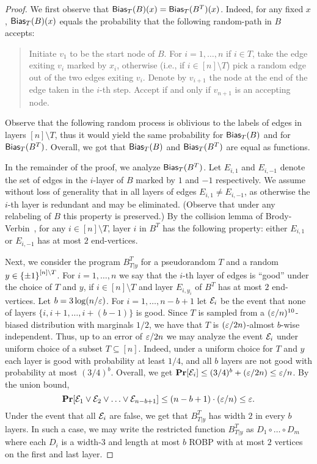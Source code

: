 \begin{proof}
We first observe that $\mathsf{Bias}_T(B)(x) = \mathsf{Bias}_T(B^T)(x)$.
Indeed, for any fixed $x$, $\mathsf{Bias}_T(B)(x)$ equals the probability that the following random-path in $B$ accepts:
\begin{quote}
Initiate $v_1$ to be the start node of $B$. For $i=1, \ldots, n$ if $i \in T$, take the edge exiting $v_i$ marked by $x_i$, otherwise (i.e., if $i\in [n]\setminus T$) pick a random edge out of the two edges exiting $v_{i}$. Denote by $v_{i+1}$ the node at the end of the edge taken in the $i$-th step. Accept if and only if $v_{n+1}$ is an accepting node.\end{quote}
 Observe that the following random process is oblivious to the labels of edges in layers $[n]\setminus T$, thus it would yield the same probability for $\mathsf{Bias}_T(B)$ and for $\mathsf{Bias}_T(B^{T})$. Overall, we got that $\mathsf{Bias}_T(B)$ and $\mathsf{Bias}_T(B^T)$ are equal as functions.

In the remainder of the proof, we analyze $\mathsf{Bias}_T(B^T)$.
Let $E_{i,1}$ and $E_{i,-1}$ denote the set of edges in the $i$-layer of $B$ marked by $1$ and $-1$ respectively.
We assume without loss of generality that in all layers of edges  $E_{i,1} \neq E_{i,-1}$, as otherwise the $i$-th layer is redundant and may be eliminated.
(Observe that under any relabeling of $B$ this property is preserved.)
By the collision lemma of Brody-Verbin~\cite{BrodyV10}, for any $i\in [n] \setminus T$, layer $i$ in $B^T$ has the following property: either $E_{i,1}$ or $E_{i,-1}$ has at most $2$ end-vertices.

Next, we consider the program $B^{T}_{T|y}$ for a pseudorandom $T$ and a random $y\in {\{\pm1\}}^{[n]\setminus T}$.
For $i=1, \ldots, n$ we say that the $i$-th layer of edges is ``good'' under the choice of $T$ and $y$, if $i \in [n] \setminus T$ and layer $E_{i,y_i}$ of $B^T$ has at most $2$ end-vertices.
Let $b = 3 \log(n/\varepsilon)$.
For $i=1, \ldots, n-b+1$ let $\mathcal{E}_i$ be the event that none of layers $\{i,i+1, \ldots, i+(b-1)\}$ is good.
Since $T$ is sampled from a $(\varepsilon/n)^{10}$-biased distribution with marginals $1/2$, we have that $T$ is $(\varepsilon/2n)$-almost $b$-wise independent.
Thus, up to an error of $\varepsilon/2n$ we may analyze the event $\mathcal{E}_i$ under uniform choice of a subset $T\subseteq[n]$.
Indeed, under a uniform choice for $T$ and $y$ each layer is good with probability at least $1/4$, and all $b$ layers are not good with probability at most $(3/4)^{b}$.
Overall, we get $\mathop{\bf Pr\/}[\mathcal{E}_i] \le (3/4)^{b} + (\varepsilon/2n) \le \varepsilon/n$.
By the union bound, $$\mathop{\bf Pr\/}[\mathcal{E}_1 \vee \mathcal{E}_2 \vee \ldots \vee \mathcal{E}_{n-b+1}] \le (n-b+1) \cdot (\varepsilon/n) \le \varepsilon.$$
Under the event that all $\mathcal{E}_i$ are false, we get that $B^T_{T|y}$ has width $2$ in every $b$ layers. %
In such a case, we may write the restricted function $B^T_{T|y}$ as $D_1 \circ \ldots \circ D_m$ where each $D_i$ is a width-$3$ and length at most $b$ ROBP with at most $2$ vertices on the first and last layer.
\end{proof}

